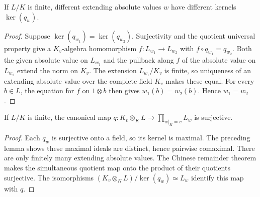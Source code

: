 \begin{lemma}
\label{lem:completion-tensor-kernels}
\leanok
{}
If $L/K$ is finite, different extending absolute values $w$ have
different kernels $\ker(q_w)$.
\end{lemma}
\begin{proof}
Suppose $\ker(q_{w_1})=\ker(q_{w_2})$. Surjectivity and the quotient
universal property give a $K_v$-algebra homomorphism
$f:L_{w_1}\to L_{w_2}$ with $f\circ q_{w_1}=q_{w_2}$.
Both the given absolute value on $L_{w_1}$ and the pullback along
$f$ of the absolute value on $L_{w_2}$ extend the norm on $K_v$.
The extension $L_{w_1}/K_v$ is finite, so uniqueness of an extending
absolute value over the complete field $K_v$ makes these equal.
For every $b\in L$, the equation for $f$ on $1\otimes b$ then gives
$w_1(b)=w_2(b)$. Hence $w_1=w_2$.
\end{proof}

\begin{lemma}
\label{lem:completion-tensor-product-surjective}
\leanok
{}
If $L/K$ is finite, the canonical map
$q:K_v\otimes_KL\to\prod_{w|_K=v}L_w$ is surjective.
\end{lemma}
\begin{proof}
Each $q_w$ is surjective onto a field, so its kernel is maximal.
The preceding lemma shows these maximal ideals are distinct, hence
pairwise comaximal. There are only finitely many extending absolute
values. The Chinese remainder theorem makes the simultaneous quotient
map onto the product of their quotients surjective. The isomorphisms
$(K_v\otimes_KL)/\ker(q_w)\simeq L_w$ identify this map with $q$.
\end{proof}

